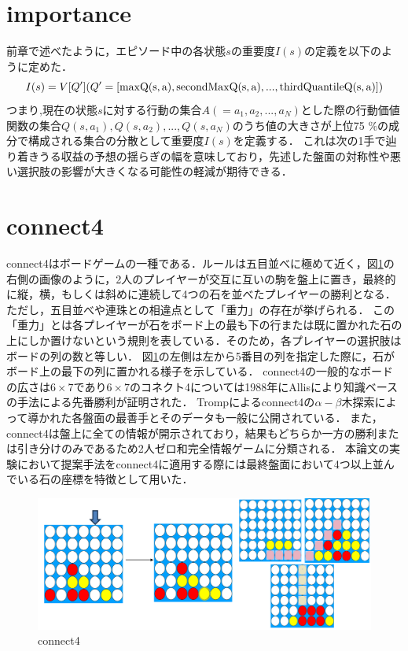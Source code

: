 \section{importance}
前章で述べたように，エピソード中の各状態$s$の重要度$I(s)$の定義を以下のように定めた．
\begin{equation}
    \label{new-imp}
	{I(s)=V[Q'] (Q'=[\rm{max}Q(s, a), \rm{secondMax}Q(s, a), ..., \rm{thirdQuantile}Q(s, a)])}
\end{equation}
つまり,現在の状態$s$に対する行動の集合$A(={a_1, a_2, ..., a_N})$とした際の行動価値関数の集合${Q(s, a_1), Q(s, a_2), ..., Q(s, a_N)}$のうち値の大きさが上位75
\%の成分で構成される集合の分散として重要度$I(s)$を定義する．
これは次の1手で辿り着きうる収益の予想の揺らぎの幅を意味しており，先述した盤面の対称性や悪い選択肢の影響が大きくなる可能性の軽減が期待できる．

\section{connect4}
connect4はボードゲームの一種である．ルールは五目並べに極めて近く，図\ref{fig:connect4}の右側の画像のように，2人のプレイヤーが交互に互いの駒を盤上に置き，最終的に縦，横，もしくは斜めに連続して4つの石を並べたプレイヤーの勝利となる．ただし，五目並べや連珠との相違点として「重力」の存在が挙げられる．
この「重力」とは各プレイヤーが石をボード上の最も下の行または既に置かれた石の上にしか置けないという規則を表している．そのため，各プレイヤーの選択肢はボードの列の数と等しい．
図\ref{fig:connect4}の左側は左から5番目の列を指定した際に，石がボード上の最下の列に置かれる様子を示している．
connect4の一般的なボードの広さは$6\times7$であり$6\times7$のコネクト4については1988年にAllis\cite{allis}により知識ベースの手法による先番勝利が証明された．
Tromp\cite{data}によるconnect4の$\alpha-\beta$木探索によって導かれた各盤面の最善手とそのデータも一般に公開されている．
また，connect4は盤上に全ての情報が開示されており，結果もどちらか一方の勝利または引き分けのみであるため2人ゼロ和完全情報ゲーム\cite{gairon}に分類される．
本論文の実験において提案手法をconnect4に適用する際には最終盤面において4つ以上並んでいる石の座標を特徴として用いた．
\begin{figure}[t]
	\centering
    \includegraphics[width=\linewidth]{./figure/connect4.png}
	\caption{connect4}
	\label{fig:connect4}
\end{figure}

